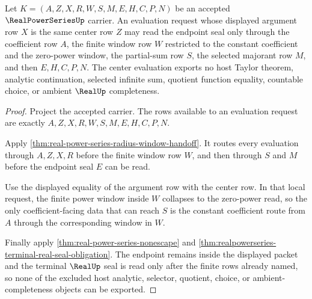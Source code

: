 \begin{theorem}\label{thm:real-power-series-center-evaluation-window}
Let $K=(A,Z,X,R,W,S,M,E,H,C,P,N)$ be an accepted $\RealPowerSeriesUp$ carrier. An evaluation request whose displayed argument row $X$ is the same center row $Z$ may read the endpoint seal only through the coefficient row $A$, the finite window row $W$ restricted to the constant coefficient and the zero-power window, the partial-sum row $S$, the selected majorant row $M$, and then $E,H,C,P,N$. The center evaluation exports no host Taylor theorem, analytic continuation, selected infinite sum, quotient function equality, countable choice, or ambient $\RealUp$ completeness.
\end{theorem}
\begin{proof}
Project the accepted carrier. The rows available to an evaluation request are exactly $A,Z,X,R,W,S,M,E,H,C,P,N$.

Apply \autoref{thm:real-power-series-radius-window-handoff}. It routes every evaluation through $A,Z,X,R$ before the finite window row $W$, and then through $S$ and $M$ before the endpoint seal $E$ can be read.

Use the displayed equality of the argument row with the center row. In that local request, the finite power window inside $W$ collapses to the zero-power read, so the only coefficient-facing data that can reach $S$ is the constant coefficient route from $A$ through the corresponding window in $W$.

Finally apply \autoref{thm:real-power-series-nonescape} and \autoref{thm:realpowerseries-terminal-real-seal-obligation}. The endpoint remains inside the displayed packet and the terminal $\RealUp$ seal is read only after the finite rows already named, so none of the excluded host analytic, selector, quotient, choice, or ambient-completeness objects can be exported.
\end{proof}


